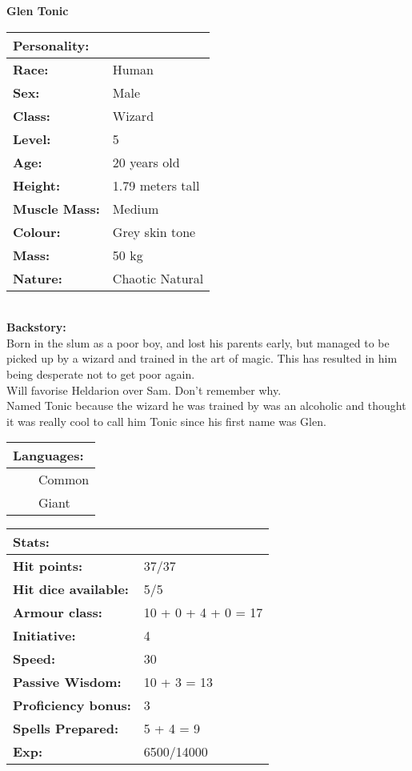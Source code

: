 \documentclass[11pt]{article}
\newcommand{\tabitem}{~~\llap{--}~~}
\begin{document}
	\begin{center}
\Huge \textbf{Glen Tonic}
	\end{center}
	\begin{multicols}{2}
\noindent \begin{tabularx}{95mm}{@{}l l}
\Large \textbf{Personality:} 	& 					\\
\hline
\textbf{Race:} 					& Human 			\\
\textbf{Sex:} 					& Male 				\\
\textbf{Class:}					& Wizard			\\
\textbf{Level:} 				& 5 	 			\\
\textbf{Age:} 					& 20 years old 		\\
\textbf{Height:} 				& 1.79 meters tall 	\\
\textbf{Muscle Mass:} 			& Medium 			\\
\textbf{Colour:} 				& Grey skin tone 	\\
\textbf{Mass:} 					& 50 kg 			\\
\textbf{Nature:} 				& Chaotic Natural
		\end{tabularx} \\
\textbf{Backstory:} \\
Born in the slum as a poor boy, and lost his parents early, but managed to be picked up by a wizard and trained in the art of magic. This has resulted in him being desperate not to get poor again. \\
Will favorise Heldarion over Sam. Don't remember why. \\
Named Tonic because the wizard he was trained by was an alcoholic and thought it was really cool to call him Tonic since his first name was Glen. \\

\noindent \begin{tabularx}{95mm}{@{}l}
{\Large \textbf{Languages:}} \\
\hline
\tabitem Common \\
\tabitem Giant
		\end{tabularx}
		
\vspace{4mm}
		
\noindent \begin{tabularx}{95mm}{@{}l l}
\Large \textbf{Stats:}		 	& 							\\
\hline
\textbf{Hit points:} 			& 37/37					 	\\
\textbf{Hit dice available:}	& 5/5						\\
\textbf{Armour class:} 			& 10 + 0 + 4 + 0 = 17 		\\
\textbf{Initiative:} 			& 4	 						\\
\textbf{Speed:} 				& 30		 				\\
\textbf{Passive Wisdom:} 		& 10 + 3 = 13	 			\\
\textbf{Proficiency bonus:}		& 3							\\
\textbf{Spells Prepared:} 		& 5 + 4 = 9		 			\\
\textbf{Exp:} 					& 6500/14000
		\end{tabularx}
		

\end{multicols}
\end{document}
